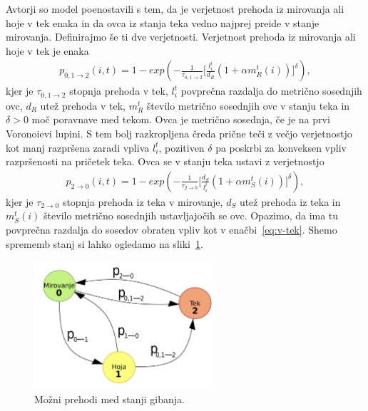 Avtorji so model poenostavili s tem, da je verjetnost prehoda iz mirovanja ali hoje v tek enaka in da ovca iz stanja teka vedno najprej preide v stanje mirovanja. Definirajmo še ti dve verjetnosti.
Verjetnost prehoda iz mirovanja ali hoje v tek je enaka
\begin{align}
p_{0,1\rightarrow2}(i, t)=1 - exp(-\frac{1}{\tau_{0,1\rightarrow 2}}\lbrack \frac{l_i^t}{d_R}(1+\alpha m_R^t(i))\rbrack^\delta), \label{eq:v-tek}
\end{align}
kjer je $\tau_{0,1\rightarrow 2}$ stopnja prehoda v tek, $l_i^t$ povprečna razdalja do metrično sosednjih ovc, $d_R$ utež prehoda v tek, $m_R^t$ število metrično sosednjih ovc v stanju teka in $\delta>0$ moč poravnave med tekom. Ovca je metrično sosednja, če je na prvi Voronoievi lupini. S tem bolj razkropljena čreda prične teči z večjo verjetnostjo kot manj razpršena zaradi vpliva $l_i^t$, pozitiven $\delta$ pa poskrbi za konveksen vpliv razpršenosti na pričetek teka. Ovca se v stanju teka ustavi z verjetnostjo
\begin{align}
p_{2\rightarrow0}(i, t)=1 - exp(-\frac{1}{\tau_{2\rightarrow 0}}\lbrack \frac{d_S}{l_i^t}(1+\alpha m_S^t(i))\rbrack^\delta), \label{eq:iz-teka}
\end{align}
kjer je $\tau_{2\rightarrow 0}$ stopnja prehoda iz teka v mirovanje, $d_S$ utež prehoda iz teka in $m_S^t(i)$ število metrično sosednjih ustavljajočih se ovc. Opazimo, da ima tu povprečna razdalja do sosedov obraten vpliv kot v enačbi~\eqref{eq:v-tek}.
Shemo sprememb stanj si lahko ogledamo na sliki~\ref{fig:ginelli-stanja}.

\begin{figure}[ht]  %
	\centering
	\includegraphics[width=0.6\textwidth]{../poglavja/images/prehodi.pdf}
	\caption[Možni prehodi med stanji gibanja]{Možni prehodi med stanji gibanja.} %
	\label{fig:ginelli-stanja}
\end{figure}

